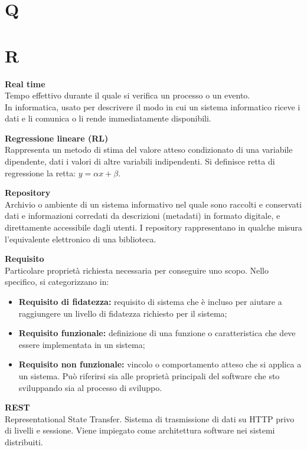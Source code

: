 \documentclass[a4paper, oneside, openany, dvipsnames, table, 12pt]{article}
\begin{document}
\newpage
\section{Q}

\newpage
\section{R}
\textbf{Real time} \\
Tempo effettivo durante il quale si verifica un processo o un evento. \\
In informatica, usato per descrivere il modo in cui un sistema informatico riceve i dati e li comunica o li rende immediatamente disponibili.

\textbf{Regressione lineare (RL)} \\
Rappresenta un metodo di stima del valore atteso condizionato di una variabile dipendente, dati i valori di altre variabili indipendenti. Si definisce retta di regressione la retta: $y = \alpha x + \beta $.

\textbf{Repository} \\
Archivio o ambiente di un sistema informativo nel quale sono raccolti e conservati dati e informazioni corredati da descrizioni (metadati) in formato digitale, e direttamente accessibile dagli utenti. I repository
rappresentano in qualche misura l’equivalente elettronico di una biblioteca.

\textbf{Requisito}\\	Particolare proprietà richiesta necessaria per conseguire uno scopo. Nello specifico, si categorizzano in:
\begin{itemize}
	\item \textbf{Requisito di fidatezza:} requisito di sistema che è incluso per aiutare a raggiungere un livello di fidatezza richiesto per il sistema;
	\item \textbf{Requisito funzionale:} definizione di una funzione o caratteristica che deve essere implementata in un sistema;
	\item \textbf{Requisito non funzionale:} vincolo o comportamento atteso che si applica a un sistema. Può riferirsi sia alle proprietà principali del software che sto sviluppando sia al processo di sviluppo.
\end{itemize}

\textbf{REST} \\
Representational State Transfer. Sistema di trasmissione di dati su HTTP privo di livelli e sessione. Viene impiegato come architettura software nei sistemi distribuiti.
\end{document}
